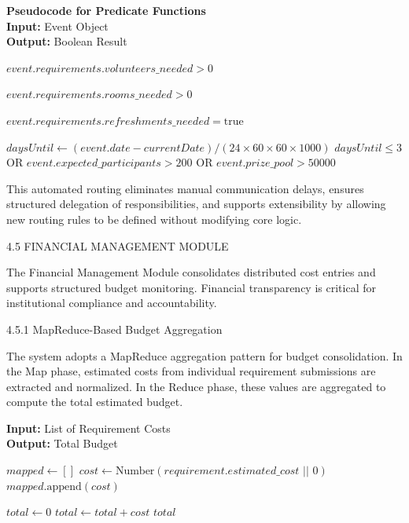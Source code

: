 \noindent\textbf{Pseudocode for Predicate Functions} 
\vspace{.2em} \\
\noindent\textbf{Input:} Event Object\\
\noindent\textbf{Output:} Boolean Result
\begin{algorithmic}[1]
    \State \Return $event.requirements.volunteers\_needed > 0$
\EndFunction

    \State \Return $event.requirements.rooms\_needed > 0$
\EndFunction

    \State \Return $event.requirements.refreshments\_needed = \text{true}$
\EndFunction

    \State $daysUntil \gets (event.date - currentDate) / (24 \times 60 \times 60 \times 1000)$
    \State \Return $daysUntil \leq 3$ OR $event.expected\_participants > 200$ OR $event.prize\_pool > 50000$
\EndFunction
\end{algorithmic}

This automated routing eliminates manual communication delays, ensures structured delegation of responsibilities, and supports extensibility by allowing new routing rules to be defined without modifying core logic.

4.5 FINANCIAL MANAGEMENT MODULE

The Financial Management Module consolidates distributed cost entries and supports structured budget monitoring. Financial transparency is critical for institutional compliance and accountability.

4.5.1 MapReduce-Based Budget Aggregation

The system adopts a MapReduce aggregation pattern for budget consolidation. In the Map phase, estimated costs from individual requirement submissions are extracted and normalized. In the Reduce phase, these values are aggregated to compute the total estimated budget.

\begin{algorithm}[H]
\caption{MapReduce Budget Aggregation}
\label{alg:budget_aggregation}
\textbf{Input:} List of Requirement Costs\\
\textbf{Output:} Total Budget
\begin{algorithmic}[1]
    \State $mapped \gets []$
        \State $cost \gets \text{Number}(requirement.estimated\_cost \text{ || } 0)$
        \State $mapped.\text{append}(cost)$
    \EndFor
    
    \State $total \gets 0$
        \State $total \gets total + cost$
    \EndFor
    \State \Return $total$
\EndFunction
\end{algorithmic}
\end{algorithm}

